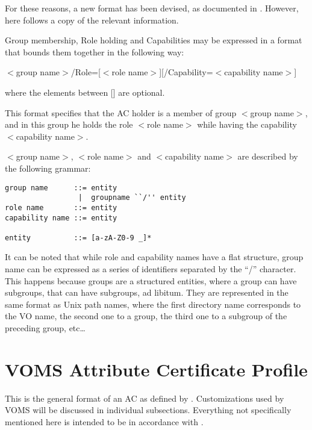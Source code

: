 \documentclass[a4]{article}
\begin{document}
For these reasons, a new format has been devised, as documented in
\cite{fqan}.  However, here follows a copy of the relevant information.

Group membership, Role holding and Capabilities may be expressed in a
format that bounds them together in the following way:

\begin{center}
$<$group name$>$/Role=[$<$role name$>$][/Capability=$<$capability name$>$]
\end{center}

where the elements between [] are optional.

This format specifies that the AC holder is a member of group $<$group
name$>$, and in this group he holds the role $<$role name$>$ while
having the capability $<$capability name$>$.

$<$group name$>$, $<$role name$>$ and $<$capability name$>$ are
described by the following grammar:

\begin{verbatim}
group name      ::= entity
                 |  groupname ``/'' entity
role name       ::= entity
capability name ::= entity

entity          ::= [a-zA-Z0-9 _]*
\end{verbatim}

It can be noted that while role and capability names have a flat
structure, group name can be expressed as a series of identifiers
separated by the ``/'' character.  This happens because groups are a
structured entities, where a group can have subgroups, that can have
subgroups, ad libitum.  They are represented in the same format as
Unix path names, where the first directory name corresponds to the VO
name, the second one to a group, the third one to a subgroup of the
preceding group, etc\ldots

\section{VOMS Attribute Certificate Profile}

This is the general format of an AC as defined by \cite{rfc3281}.
Customizations used by VOMS will be discussed in individual
subsections.  Everything not specifically mentioned here is intended
to be in accordance with \cite{rfc3281}.
\end{document}

